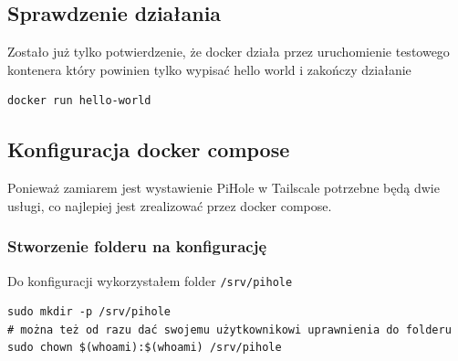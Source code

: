 \documentclass{report}
\numberwithin{equation}{section}
\begin{document}
\subsection{Sprawdzenie działania}
Zostało już tylko potwierdzenie, że docker działa przez uruchomienie testowego kontenera który powinien tylko wypisać hello world i zakończy działanie
\begin{verbatim}
docker run hello-world
\end{verbatim}

\subsection{Konfiguracja docker compose}
Ponieważ zamiarem jest wystawienie PiHole w Tailscale potrzebne będą dwie usługi, co najlepiej jest zrealizować przez docker compose.

\subsubsection{Stworzenie folderu na konfigurację}
Do konfiguracji wykorzystałem folder \texttt{/srv/pihole}
\begin{verbatim}
sudo mkdir -p /srv/pihole
# można też od razu dać swojemu użytkownikowi uprawnienia do folderu
sudo chown $(whoami):$(whoami) /srv/pihole
\end{verbatim}
\end{document}
